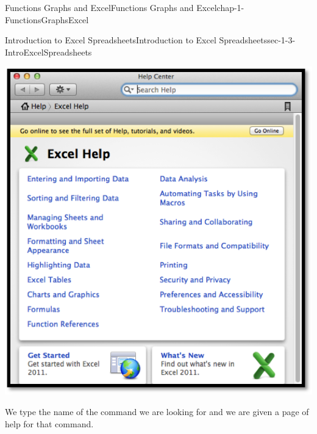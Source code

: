 \documentclass[oneside,10pt,]{book}
\numberwithin{equation}{section}
\begin{document}
\begin{chapterptx}{Functions Graphs and Excel}{}{Functions Graphs and Excel}{}{}{chap-1-FunctionsGraphsExcel}
\begin{sectionptx}{Introduction to Excel Spreadsheets}{}{Introduction to Excel Spreadsheets}{}{}{sec-1-3-IntroExcelSpreadsheets}
\begin{sidebyside}{1}{0.1}{0.1}{0}
\begin{sbspanel}{0.8}
\includegraphics[width=1\linewidth]{images/sec1-3-16.png}
\end{sbspanel}%
\end{sidebyside}%
\par
\hypertarget{p-268}{}%
We type the name of the command we are looking for and we are given a page of help for that command.%
\begin{sidebyside}{1}{0.1}{0.1}{0}%
\begin{sbspanel}{0.8}%

\end{sbspanel}
\end{sidebyside}
\end{sectionptx}
\end{chapterptx}
\end{document}
